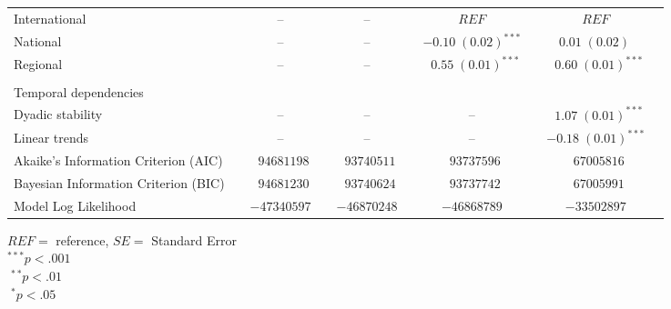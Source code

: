 \begin{table}[!h]
\begin{center}
\begin{tabular}{@{}lcclclclcl@{}}
\hspace{10pt}International & & -- & & -- & & $REF$ & & $REF$ \\
\hspace{10pt}National &  & -- &  & -- &  & $-0.10 \; (0.02)^{***}$        &  & $\hspace{6pt}0.01 \; (0.02)^{~~~~}$        \\
\hspace{10pt}Regional &  & -- &  & --  &  & $\hspace{6pt}0.55 \; (0.01)^{***}$  &  & $\hspace{6pt}0.60 \; (0.01)^{***}$  \\ \\
Temporal dependencies & & & & & & & & \\
\hspace{10pt}Dyadic stability          &  & --  &  & --  &  & --  &  & $\hspace{6pt}1.07 \; (0.01)^{***}$  \\
\hspace{10pt}Linear trends        &  & -- &  & -- &  & -- &  & $-0.18 \; (0.01)^{***}$ \\
\midrule
Akaike's Information Criterion (AIC)  &  & $\hspace{6pt}94681198$ &  & $\hspace{6pt}93740511$ &  & $\hspace{6pt}93737596$ &  & $\hspace{6pt}67005816$           \\
Bayesian Information Criterion (BIC)  &  & $\hspace{6pt}94681230$ &  & $\hspace{6pt}93740624$           &  & $\hspace{6pt}93737742$ &  & $\hspace{6pt}67005991$           \\
Model Log Likelihood &  & $-47340597$ &  & $-46870248$ &  & $-46868789$ &  & $-33502897$   \\
\bottomrule
\end{tabular}
      \hspace*{-1cm}
      \raggedright \scriptsize
      $REF=$ reference, $SE=$ Standard Error\\
      ${ }^{***} p < .001$\\
      ${ }^{\hspace{3pt}**} p < .01$\\
      ${ }^{\hspace{5pt}*} p < .05$
\end{center}
\end{table}

